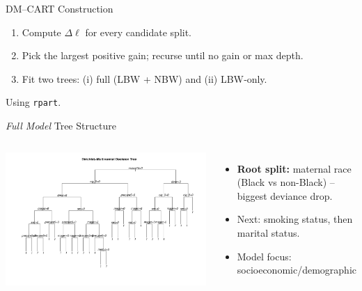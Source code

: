\documentclass[aspectratio=169,professionalfonts]{beamer}
\begin{document}

\begin{frame}{DM–CART Construction}
\begin{enumerate}
  \item Compute $\Delta\ell$ for every candidate split.
  \item Pick the largest positive gain; recurse until no gain or max depth.
  \item Fit two trees: (i) full (LBW + NBW) and (ii) LBW‑only.
\end{enumerate}
{\footnotesize Using \texttt{rpart}\;\citep{intro_to_rpart,rpart_docs}.}
\end{frame}

\begin{frame}{\emph{Full Model} Tree Structure}
\footnotesize
\begin{columns}[T]  %
\centering
\includegraphics[height=0.75\textheight,keepaspectratio]{plots/dm_tree2021.pdf}

\begin{itemize}\itemsep2pt
  \item \textbf{Root split:} maternal race (Black vs non-Black) – biggest deviance drop.
  \item Next: smoking status, then marital status.
  \item Model focus: socioeconomic/demographic
\end{itemize}
\end{columns}
\end{frame}
\end{document}
